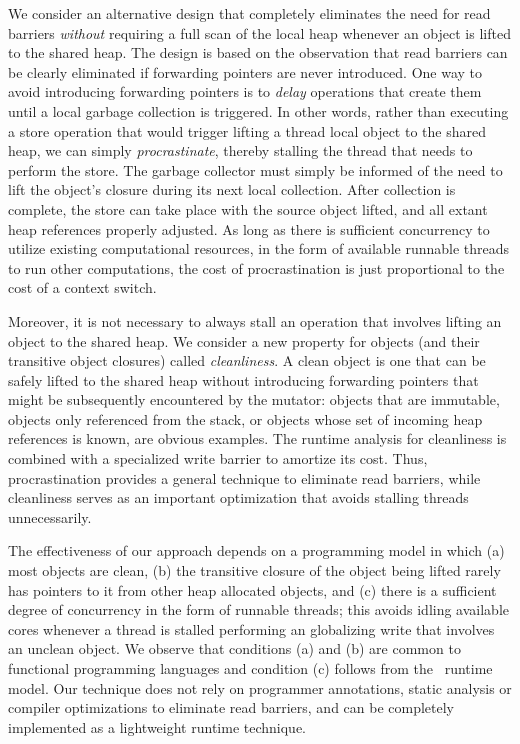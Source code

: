 We consider an alternative design that completely eliminates the need for read
barriers \emph{without} requiring a full scan of the local heap whenever an
object is lifted to the shared heap.  The design is based on the observation
that read barriers can be clearly eliminated if forwarding pointers are never
introduced.  One way to avoid introducing forwarding pointers is to
\emph{delay} operations that create them until a local garbage collection is
triggered.  In other words, rather than executing a store operation that would
trigger lifting a thread local object to the shared heap, we can simply
\emph{procrastinate}, thereby stalling the thread that needs to perform the
store.  The garbage collector must simply be informed of the need to lift the
object's closure during its next local collection. After collection is
complete, the store can take place with the source object lifted, and all
extant heap references properly adjusted.  As long as there is sufficient
concurrency to utilize existing computational resources, in the form of
available runnable threads to run other computations, the cost of
procrastination is just proportional to the cost of a context switch.

Moreover, it is not necessary to always stall an operation that involves
lifting an object to the shared heap.  We consider a new property for objects
(and their transitive object closures) called \emph{cleanliness}.  A clean
object is one that can be safely lifted to the shared heap without introducing
forwarding pointers that might be subsequently encountered by the mutator:
objects that are immutable, objects only referenced from the stack, or objects
whose set of incoming heap references is known, are obvious examples.  The
runtime analysis for cleanliness is combined with a specialized write barrier
to amortize its cost.  Thus, procrastination provides a general technique to
eliminate read barriers, while cleanliness serves as an important optimization
that avoids stalling threads unnecessarily.

The effectiveness of our approach depends on a programming model in which (a)
most objects are clean, (b) the transitive closure of the object being lifted
rarely has pointers to it from other heap allocated objects, and (c) there is a
sufficient degree of concurrency in the form of runnable threads; this avoids
idling available cores whenever a thread is stalled performing an globalizing
write that involves an unclean object.  We observe that conditions (a) and (b)
are common to functional programming languages and condition (c) follows from
the \acml\ runtime model. Our technique does not rely on programmer
annotations, static analysis or compiler optimizations to eliminate read
barriers, and can be completely implemented as a lightweight runtime technique.

